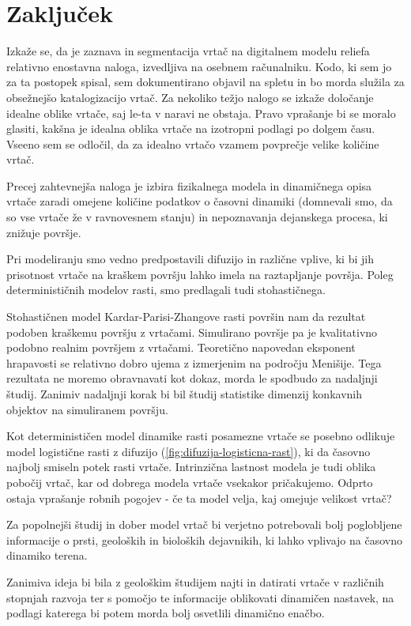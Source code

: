\documentclass[a4paper, twoside, 12pt]{book}
\begin{document}
    \chapter{Zaključek}

    Izkaže se, da je zaznava in segmentacija vrtač na digitalnem modelu reliefa relativno enostavna naloga, izvedljiva na osebnem računalniku. Kodo, ki sem jo za ta postopek spisal, sem dokumentirano objavil na spletu in bo morda služila za obsežnejšo katalogizacijo vrtač.
    Za nekoliko težjo nalogo se izkaže določanje idealne oblike vrtače, saj le-ta v naravi ne obstaja. Pravo vprašanje bi se moralo glasiti, kakšna je idealna oblika vrtače na izotropni podlagi po dolgem času. Vseeno sem se odločil, da za idealno vrtačo vzamem povprečje velike količine vrtač.

    Precej zahtevnejša naloga je izbira fizikalnega modela in dinamičnega opisa vrtače zaradi omejene količine podatkov o časovni dinamiki (domnevali smo, da so vse vrtače že v ravnovesnem stanju) in nepoznavanja dejanskega procesa, ki znižuje površje.

    Pri modeliranju smo vedno predpostavili difuzijo in različne vplive, ki bi jih prisotnost vrtače na kraškem površju lahko imela na raztapljanje površja. Poleg determinističnih modelov rasti, smo predlagali tudi stohastičnega.

    Stohastičnen model Kardar-Parisi-Zhangove rasti površin nam da rezultat podoben kraškemu površju z vrtačami. Simulirano površje pa je kvalitativno podobno realnim površjem z vrtačami. Teoretično napovedan eksponent hrapavosti se relativno dobro ujema z izmerjenim na področju Menišije. Tega rezultata ne moremo obravnavati kot dokaz, morda le spodbudo za nadaljnji študij. Zanimiv nadaljnji korak bi bil študij statistike dimenzij konkavnih objektov na simuliranem površju.

    Kot determinističen model dinamike rasti posamezne vrtače se posebno odlikuje model logistične rasti z difuzijo (\ref{fig:difuzija-logisticna-rast}), ki da časovno najbolj smiseln potek rasti vrtače. Intrinzična lastnost modela je tudi oblika pobočij vrtač, kar od dobrega modela vrtače vsekakor pričakujemo. Odprto ostaja vprašanje robnih pogojev - če ta model velja, kaj omejuje velikost vrtač?

    Za popolnejši študij in dober model vrtač bi verjetno potrebovali bolj poglobljene informacije o prsti, geoloških in bioloških dejavnikih, ki lahko vplivajo na časovno dinamiko terena.

Zanimiva ideja bi bila z geološkim študijem najti in datirati vrtače v različnih stopnjah razvoja ter s pomočjo te informacije oblikovati dinamičen nastavek, na podlagi katerega bi potem morda bolj osvetlili dinamično enačbo.
\end{document}
